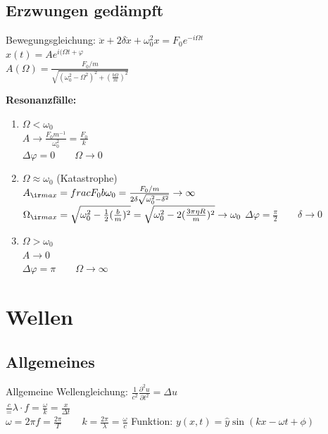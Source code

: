 \documentclass[german]{latex4ei/latex4ei_sheet}
\begin{document}
\subsection{Erzwungen gedämpft}
Bewegungsgleichung: $\ddot{x}+2\delta \dot{x}+\omega_0^2x=F_0e^{-i\Omega t}$\\
$\hat{x}(t)=Ae^{i(\Omega t + \varphi}$\\
$A(\Omega)=\frac{F_0/m}{\sqrt{(\omega_0^2-\Omega^2)^2+(\frac{b\Omega}{m})^2}}$\\
\begin{sectionbox}
\textbf{Resonanzfälle:}
\begin{enumerate}
	\item $\Omega < \omega_0$\\
		$A\rightarrow \frac{F_0m^{-1}}{\omega_0^2}=\frac{F_0}{k}$\\
		$\Delta \varphi = 0 \qquad \Omega \rightarrow 0$
	\item $\Omega \approx \omega_0$ (Katastrophe)\\
		$A_{\ir max}=frac{F_0}{b\omega_0}=\frac{F_0/m}{2\delta \sqrt{\omega_0^2-\delta^2}} \rightarrow \infty$\\
		$\Omega_{\ir max}=\sqrt{\omega_0^2-\frac{1}{2}(\frac{b}{m})^2}=\sqrt{\omega_0^2-2(\frac{3\pi \eta R}{m})^2}\rightarrow \omega_0$
		$\Delta \varphi = \frac{\pi}{2} \qquad \delta \rightarrow 0$
		\item $\Omega > \omega_0$\\
		$A\rightarrow 0$\\
		$\Delta \varphi = \pi \qquad \Omega \rightarrow \infty$
\end{enumerate}
\end{sectionbox}

\section{Wellen}
\subsection{Allgemeines}
Allgemeine Wellengleichung: $\frac{1}{c^2}\frac{\partial^2u}{\partial t^2}=\Delta u$\\
$\frac{c}=\lambda \cdot f=\frac{\omega}{k}=\frac{x}{\Delta t}$\\
$\omega = 2\pi f=\frac{2\pi}{T} \qquad k=\frac{2\pi}{\lambda}=\frac{\omega}{c}$
Funktion: $y(x,t)=\hat{y}\sin(kx - \omega t + \phi)$
\end{document}
